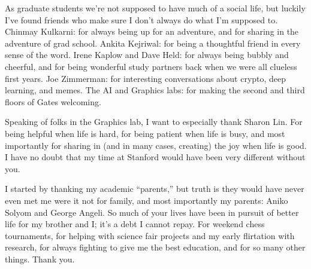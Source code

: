As graduate students we're not supposed to have much of a social life, but luckily I've
  found friends who make sure I don't always do what I'm supposed to.
Chinmay Kulkarni: for always being up for an adventure, and for sharing in the adventure of grad school.
Ankita Kejriwal: for being a thoughtful friend in every sense of the word.
Irene Kaplow and Dave Held: for always being bubbly and cheerful, and for being wonderful study partners
  back when we were all clueless first years.
Joe Zimmerman: for interesting conversations about crypto, deep learning, and memes.
The AI and Graphics labs: for making the second and third floors of Gates welcoming.

Speaking of folks in the Graphics lab, I want to especially thank Sharon Lin.
For being helpful when life is hard, for being patient when life is busy, and most importantly
  for sharing in (and in many cases, creating) the joy when life is good.
I have no doubt that my time at Stanford would have been very different without you.

I started by thanking my academic ``parents,'' but truth is they would have never
  even met me were it not for family, and most importantly my parents: Aniko Solyom and George Angeli.
So much of your lives have been in pursuit of better life for my brother and I; it's a debt I cannot
  repay.
For weekend chess tournaments, for helping with science fair projects and my early flirtation with research,
  for always fighting to give me the best education, and for so many other things.
Thank you.
